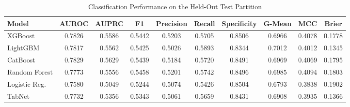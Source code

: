 \begin{table}
\centering
\caption{Classification Performance on the Held-Out Test Partition}
\label{tab:results}
\begin{tabular}{lccccccccc}
\toprule
Model & AUROC & AUPRC & F1 & Precision & Recall & Specificity & G-Mean & MCC & Brier \\
\midrule
XGBoost & 0.7826 & 0.5586 & 0.5442 & 0.5203 & 0.5705 & 0.8506 & 0.6966 & 0.4078 & 0.1778 \\
LightGBM & 0.7817 & 0.5562 & 0.5425 & 0.5026 & 0.5893 & 0.8344 & 0.7012 & 0.4012 & 0.1345 \\
CatBoost & 0.7829 & 0.5629 & 0.5439 & 0.5184 & 0.5720 & 0.8491 & 0.6969 & 0.4069 & 0.1795 \\
Random Forest & 0.7773 & 0.5556 & 0.5458 & 0.5201 & 0.5742 & 0.8496 & 0.6985 & 0.4094 & 0.1803 \\
Logistic Reg. & 0.7580 & 0.5049 & 0.5244 & 0.5074 & 0.5426 & 0.8504 & 0.6793 & 0.3838 & 0.1902 \\
TabNet & 0.7732 & 0.5356 & 0.5343 & 0.5061 & 0.5659 & 0.8431 & 0.6908 & 0.3935 & 0.1366 \\
\bottomrule
\end{tabular}
\end{table}
